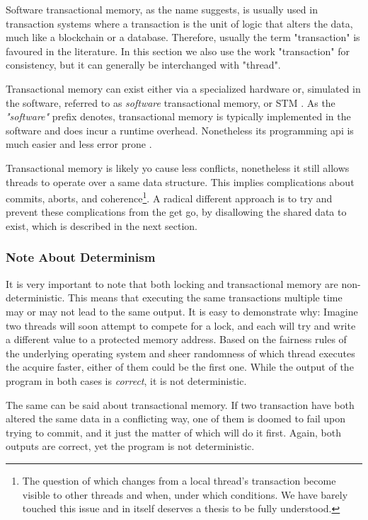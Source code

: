 \begin{remark}
	Software transactional memory, as the name suggests, is usually used in transaction systems
	where a transaction is the unit of logic that alters the data, much like a blockchain or a
	database. Therefore, usually the term "transaction" is favoured in the literature. In this
	section we also use the work "transaction" for consistency, but it can generally be interchanged
	with "thread".
\end{remark}

Transactional memory can exist either via a specialized hardware or, simulated in the software,
referred to as \textit{software} transactional memory, or STM
\cite{hammondTransactionalMemoryCoherence2004}. As the \textit{"software"} prefix denotes,
transactional memory is typically implemented in the software and does incur a runtime overhead.
Nonetheless its programming api is much easier and less error prone
\cite{herlihyTransactionalMemoryArchitectural1993}.

Transactional memory is likely yo cause less conflicts, nonetheless it still allows threads to
operate over a same data structure. This implies complications about commits, aborts, and
coherence\footnote{The question of which changes from a local thread's transaction become visible to
other threads and when, under which conditions. We have barely touched this issue and in itself
deserves a thesis to be fully understood.}. A radical different approach is to try and prevent these
complications from the get go, by disallowing the shared data to exist, which is described in the
next section.

\subsubsection{Note About Determinism}

It is very important to note that both locking and transactional memory are non-deterministic. This
means that executing the same transactions multiple time may or may not lead to the same output. It
is easy to demonstrate why: Imagine two threads will soon attempt to compete for a lock, and each
will try and write a different value to a protected memory address. Based on the fairness rules of
the underlying operating system and sheer randomness of which thread executes the acquire faster,
either of them could be the first one. While the output of the program in both cases is
\textit{correct}, it is not deterministic.

The same can be said about transactional memory. If two transaction have both altered the same data
in a conflicting way, one of them is doomed to fail upon trying to commit, and it just the matter of
which will do it first. Again, both outputs are correct, yet the program is not deterministic.

